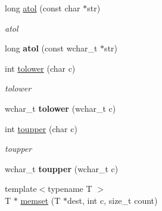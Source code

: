 \begin{DoxyCompactItemize}
\item 
\hypertarget{namespacestring__util_a99328118377e46b338d4008931489f0b}{long \hyperlink{namespacestring__util_a99328118377e46b338d4008931489f0b}{atol} (const char $\ast$str)}\label{namespacestring__util_a99328118377e46b338d4008931489f0b}

\begin{DoxyCompactList}\small\item\em atol \end{DoxyCompactList}\item 
\hypertarget{namespacestring__util_a4ace5ad59eefb2ad3aa290ff6ee45dcd}{long {\bfseries atol} (const wchar\-\_\-t $\ast$str)}\label{namespacestring__util_a4ace5ad59eefb2ad3aa290ff6ee45dcd}

\item 
\hypertarget{namespacestring__util_abe4f0e0cc9d5260ee988dd629be5cf33}{int \hyperlink{namespacestring__util_abe4f0e0cc9d5260ee988dd629be5cf33}{tolower} (char c)}\label{namespacestring__util_abe4f0e0cc9d5260ee988dd629be5cf33}

\begin{DoxyCompactList}\small\item\em tolower \end{DoxyCompactList}\item 
\hypertarget{namespacestring__util_a1a1472adfdc7d01583d9608ac28ffe43}{wchar\-\_\-t {\bfseries tolower} (wchar\-\_\-t c)}\label{namespacestring__util_a1a1472adfdc7d01583d9608ac28ffe43}

\item 
\hypertarget{namespacestring__util_ad69a7a0bcec3adae0a307357922c324b}{int \hyperlink{namespacestring__util_ad69a7a0bcec3adae0a307357922c324b}{toupper} (char c)}\label{namespacestring__util_ad69a7a0bcec3adae0a307357922c324b}

\begin{DoxyCompactList}\small\item\em toupper \end{DoxyCompactList}\item 
\hypertarget{namespacestring__util_a851103e5ef3d3ab575f8aa92d213fa42}{wchar\-\_\-t {\bfseries toupper} (wchar\-\_\-t c)}\label{namespacestring__util_a851103e5ef3d3ab575f8aa92d213fa42}

\item 
\hypertarget{namespacestring__util_a6ca68d7c6c61eaa4a378fdaa016f2e13}{{\footnotesize template$<$typename T $>$ }\\T $\ast$ \hyperlink{namespacestring__util_a6ca68d7c6c61eaa4a378fdaa016f2e13}{memset} (T $\ast$dest, int c, size\-\_\-t count)}\label{namespacestring__util_a6ca68d7c6c61eaa4a378fdaa016f2e13}


\end{DoxyCompactItemize}

